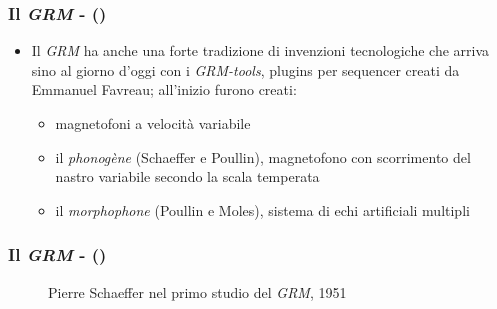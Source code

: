 \begin{frame}
    \frametitle{Il \emph{GRM} - ()}

    \begin{itemize}

        \item Il \emph{GRM} ha anche una forte tradizione di invenzioni tecnologiche
            che arriva sino al giorno d'oggi con i \emph{GRM-tools},
            plugins per sequencer creati da Emmanuel Favreau; all'inizio furono creati:

        \begin{itemize}

            \item magnetofoni a velocit\`a variabile

            \item il \emph{phonog\`ene} (Schaeffer e Poullin),
                magnetofono con scorrimento del nastro variabile
                secondo la scala temperata

            \item il \emph{morphophone} (Poullin e Moles),
                sistema di echi artificiali multipli

        \end{itemize}

    \end{itemize}

\end{frame}

\begin{frame}
    \frametitle{Il \emph{GRM} - ()}

    \begin{center}
        \begin{figure}
            \caption{Pierre Schaeffer nel primo studio del \emph{GRM}, 1951}
        \end{figure}
    \end{center}

\end{frame}
